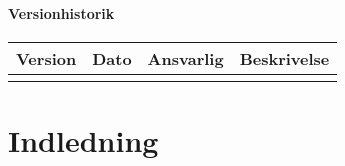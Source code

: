 \subsubsection{Versionhistorik}

\begin{longtabu} to 
    Version &    Dato &    Ansvarlig &    Beskrivelse\\[-1ex]
    \midrule
   
    	
\label{version_Systemark}
\end{longtabu}

\chapter{Indledning}

  
